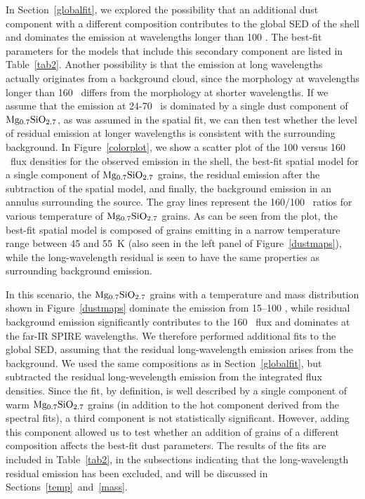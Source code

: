 \documentclass{emulateapj}
\begin{document}
In Section~\ref{globalfit}, we explored the possibility that an additional dust component with a different composition contributes to the global SED of the shell and dominates the emission at wavelengths longer than 100 \micron. The best-fit parameters for the models that include this secondary component are listed in Table~\ref{tab2}. 
Another possibility is that the emission at long wavelengths actually originates from a background cloud, since the morphology at wavelengths longer than 160 \micron\  differs from the morphology at shorter wavelengths. If we assume that the emission at 24-70 \micron\ is dominated by a single dust component of $\rm Mg_{0.7}SiO_{2.7}$, as was assumed in the spatial fit, we can then test whether the level of residual emission at longer wavelengths is consistent with the surrounding background. In Figure~\ref{colorplot}, we show a scatter plot of the 100 versus 160 \micron\ flux densities for the observed emission in the shell, the best-fit spatial model for a single component of $\rm Mg_{0.7}SiO_{2.7}$ grains, the residual emission after the subtraction of the spatial model, and finally, the background emission in an annulus surrounding the source. The gray lines represent the 160/100 \micron\ ratios for various temperature of $\rm Mg_{0.7}SiO_{2.7}$ grains. As can be seen from the plot, the best-fit spatial model is composed of grains emitting in a narrow temperature range between 45 and 55~K (also seen in the left panel of Figure~\ref{dustmaps}), while the long-wavelength residual is seen to have the same properties as surrounding background emission. 

In this scenario, the $\rm Mg_{0.7}SiO_{2.7}$ grains with a temperature and mass distribution shown in Figure~\ref{dustmaps} dominate the emission from 15--100 \micron, while residual background emission significantly contributes to the 160 \micron\ flux and dominates at the far-IR SPIRE wavelengths. We therefore performed additional fits to the global SED, assuming that the residual long-wavelength emission arises from the background. We used the same compositions as in Section~\ref{globalfit}, but subtracted the residual long-wevelength emission from the integrated flux densities. Since the fit, by definition, is well described by a single component of warm $\rm Mg_{0.7}SiO_{2.7}$ grains (in addition to the hot component derived from the spectral fits), a third component is not statistically significant. However, adding this component allowed us to test whether an addition of grains of a different composition affects the best-fit dust parameters. The results of the fits are included in Table~\ref{tab2}, in the subsections indicating that the long-wavelength residual emission has been excluded, and will be discussed in Sections~\ref{temp}~and~\ref{mass}.
\end{document}

